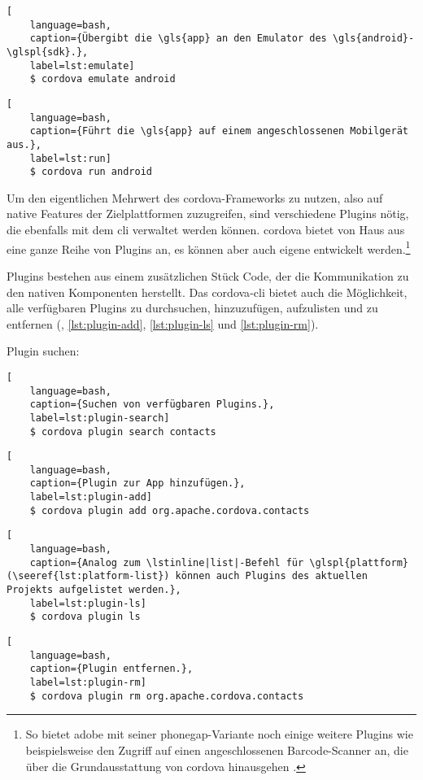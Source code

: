 {\begin{lstlisting}[
	language=bash,
	caption={Übergibt die \gls{app} an den Emulator des \gls{android}-\glspl{sdk}.},
	label=lst:emulate]
	$ cordova emulate android
\end{lstlisting}

\begin{lstlisting}[
	language=bash,
	caption={Führt die \gls{app} auf einem angeschlossenen Mobilgerät aus.},
	label=lst:run]
	$ cordova run android
\end{lstlisting}

Um den eigentlichen Mehrwert des \gls{cordova}-Frameworks zu nutzen, also auf native Features der Zielplattformen zuzugreifen, sind verschiedene Plugins nötig, die ebenfalls mit dem \gls{cli} verwaltet werden können.
\gls{cordova} bietet von Haus aus eine ganze Reihe von Plugins an, es können aber auch eigene entwickelt werden.\footnote{So bietet \zB \gls{adobe} mit seiner \gls{phonegap}-Variante noch einige weitere Plugins wie beispielsweise den Zugriff auf einen angeschlossenen Barcode-Scanner an, die über die Grundausstattung von \gls{cordova} hinausgehen \cite{Cordova-Docs_CLI}.}

Plugins bestehen aus einem zusätzlichen Stück Code, der die Kommunikation zu den nativen Komponenten herstellt.
Das \gls{cordova}-\gls{cli} bietet auch die Möglichkeit, alle verfügbaren Plugins zu durchsuchen, hinzuzufügen, aufzulisten und zu entfernen (, \ref{lst:plugin-add}, \ref{lst:plugin-ls} und \ref{lst:plugin-rm}).

Plugin suchen: 
\begin{lstlisting}[
	language=bash,
	caption={Suchen von verfügbaren Plugins.},
	label=lst:plugin-search]
	$ cordova plugin search contacts
\end{lstlisting}

\begin{lstlisting}[
	language=bash,
	caption={Plugin zur App hinzufügen.},
	label=lst:plugin-add]
	$ cordova plugin add org.apache.cordova.contacts
\end{lstlisting}

\begin{lstlisting}[
	language=bash,
	caption={Analog zum \lstinline|list|-Befehl für \glspl{plattform} (\seeref{lst:platform-list}) können auch Plugins des aktuellen Projekts aufgelistet werden.},
	label=lst:plugin-ls]
	$ cordova plugin ls
\end{lstlisting}

\begin{lstlisting}[
	language=bash,
	caption={Plugin entfernen.},
	label=lst:plugin-rm]
	$ cordova plugin rm org.apache.cordova.contacts
\end{lstlisting}


}
